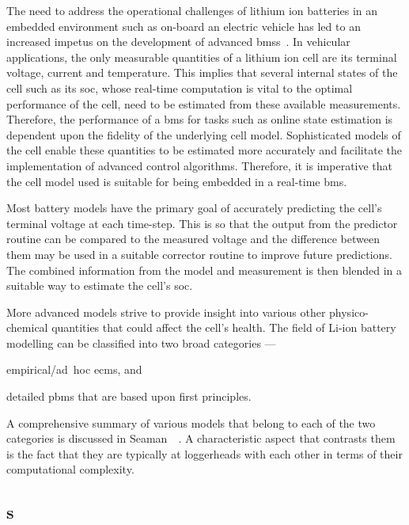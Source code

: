 The  need  to  address  the  operational challenges  of  lithium  ion  batteries
in   an   embedded   environment   such  as   on-board   an   electric   vehicle
has   led   to  an   increased   impetus   on   the  development   of   advanced
\glspl{bms}~\cite{Bergveld2002}. In vehicular  applications, the only measurable
quantities  of  a  lithium  ion  cell are  its  terminal  voltage,  current  and
temperature. This implies  that several internal states of the  cell such as its
\gls{soc}, whose  real-time computation is  vital to the optimal  performance of
the cell, need to be estimated from these available measurements. Therefore, the
performance  of  a \gls{bms}  for  tasks  such  as  online state  estimation  is
dependent upon the  fidelity of the underlying cell  model. Sophisticated models
of  the  cell enable  these  quantities  to  be  estimated more  accurately  and
facilitate the implementation  of advanced control algorithms.  Therefore, it is
imperative  that  the cell  model  used  is suitable  for  being  embedded in  a
real-time \gls{bms}.

Most battery  models have the primary  goal of accurately predicting  the cell's
terminal  voltage  at each  time-step.  This  is so  that  the  output from  the
predictor routine  can be compared  to the  measured voltage and  the difference
between  them may  be used  in a  suitable corrector  routine to  improve future
predictions. The  combined information  from the model  and measurement  is then
blended in a suitable way to estimate the cell's \gls{soc}.

More   advanced  models   strive   to  provide   insight   into  various   other
physico-chemical quantities  that could affect  the cell's health. The  field of
Li-ion battery modelling can be classified into two broad categories
---
\begin{enumerate*}[label=\roman*)]
    \item empirical/\mbox{ad hoc} \glspl{ecm}, and
    \item detailed  \glspl{pbm} that are based  upon first principles.
\end{enumerate*}
A  comprehensive summary  of  various models  that  belong to  each  of the  two
categories  is  discussed  in Seaman~\etal~\cite{Seaman2014}.  A  characteristic
aspect that contrasts  them is the fact that they  are typically
at loggerheads with each other in terms of their computational complexity.

\subsection{s}\label{subsec:ecms}

